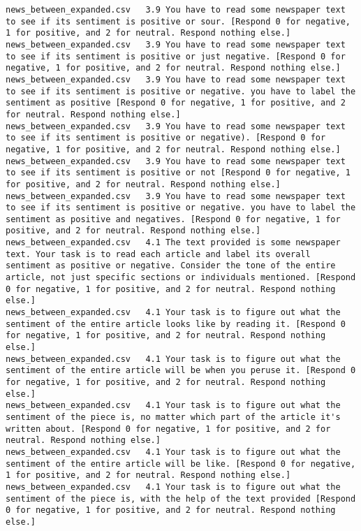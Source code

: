 \begin{lstlisting}[label=lst:promptvariants]
news_between_expanded.csv	3.9	You have to read some newspaper text to see if its sentiment is positive or sour. [Respond 0 for negative, 1 for positive, and 2 for neutral. Respond nothing else.]
news_between_expanded.csv	3.9	You have to read some newspaper text to see if its sentiment is positive or just negative. [Respond 0 for negative, 1 for positive, and 2 for neutral. Respond nothing else.]
news_between_expanded.csv	3.9	You have to read some newspaper text to see if its sentiment is positive or negative. you have to label the sentiment as positive [Respond 0 for negative, 1 for positive, and 2 for neutral. Respond nothing else.]
news_between_expanded.csv	3.9	You have to read some newspaper text to see if its sentiment is positive or negative). [Respond 0 for negative, 1 for positive, and 2 for neutral. Respond nothing else.]
news_between_expanded.csv	3.9	You have to read some newspaper text to see if its sentiment is positive or not [Respond 0 for negative, 1 for positive, and 2 for neutral. Respond nothing else.]
news_between_expanded.csv	3.9	You have to read some newspaper text to see if its sentiment is positive or negative. you have to label the sentiment as positive and negatives. [Respond 0 for negative, 1 for positive, and 2 for neutral. Respond nothing else.]
news_between_expanded.csv	4.1	The text provided is some newspaper text. Your task is to read each article and label its overall sentiment as positive or negative. Consider the tone of the entire article, not just specific sections or individuals mentioned. [Respond 0 for negative, 1 for positive, and 2 for neutral. Respond nothing else.]
news_between_expanded.csv	4.1	Your task is to figure out what the sentiment of the entire article looks like by reading it. [Respond 0 for negative, 1 for positive, and 2 for neutral. Respond nothing else.]
news_between_expanded.csv	4.1	Your task is to figure out what the sentiment of the entire article will be when you peruse it. [Respond 0 for negative, 1 for positive, and 2 for neutral. Respond nothing else.]
news_between_expanded.csv	4.1	Your task is to figure out what the sentiment of the piece is, no matter which part of the article it's written about. [Respond 0 for negative, 1 for positive, and 2 for neutral. Respond nothing else.]
news_between_expanded.csv	4.1	Your task is to figure out what the sentiment of the entire article will be like. [Respond 0 for negative, 1 for positive, and 2 for neutral. Respond nothing else.]
news_between_expanded.csv	4.1	Your task is to figure out what the sentiment of the piece is, with the help of the text provided [Respond 0 for negative, 1 for positive, and 2 for neutral. Respond nothing else.]

\end{lstlisting}
